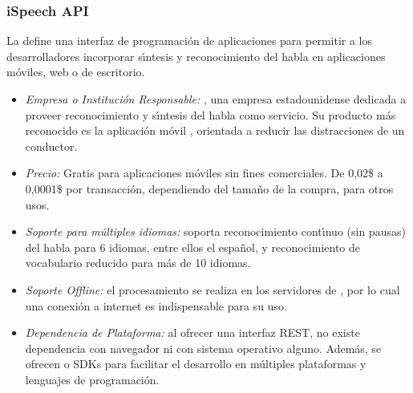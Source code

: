 \subsubsection{iSpeech API}
\label{sec:ispeech}

La  \cite{iSpeech} define una interfaz de programaci\'on de aplicaciones para permitir
a los desarrolladores incorporar s{\'\i}ntesis y reconocimiento del habla en aplicaciones m\'oviles,
web o de escritorio.

\begin{itemize}
	\item \emph{Empresa o Instituci\'on Responsable:} , una empresa estadounidense dedicada a
	proveer reconocimiento y s{\'\i}ntesis del habla como servicio. Su producto m\'as reconocido es la aplicaci\'on m\'ovil
	, orientada a reducir las distracciones de un conductor.
	\item \emph{Precio:} Gratis para aplicaciones m\'oviles sin fines comerciales. De 0,02\$ a 0,0001\$ por
	transacci\'on, dependiendo del tama\~no de la compra, para otros usos.
	\item \emph{Soporte para m\'ultiples idiomas:} soporta reconocimiento cont{\'\i}nuo (sin pausas) del habla para 6 idiomas,
	entre ellos el espa\~nol, y reconocimiento de vocabulario reducido para m\'as de 10 idiomas.
	\item \emph{Soporte Offline:} el procesamiento se realiza en los servidores de , por lo cual
	una conexi\'on a internet es indispensable para su uso.
	\item \emph{Dependencia de Plataforma:} al ofrecer una interfaz REST, no existe dependencia con navegador
	ni con sistema operativo alguno. Adem\'as, se ofrecen  o SDKs para facilitar
	el desarrollo en m\'ultiples plataformas y lenguajes de programaci\'on.
\end{itemize}
